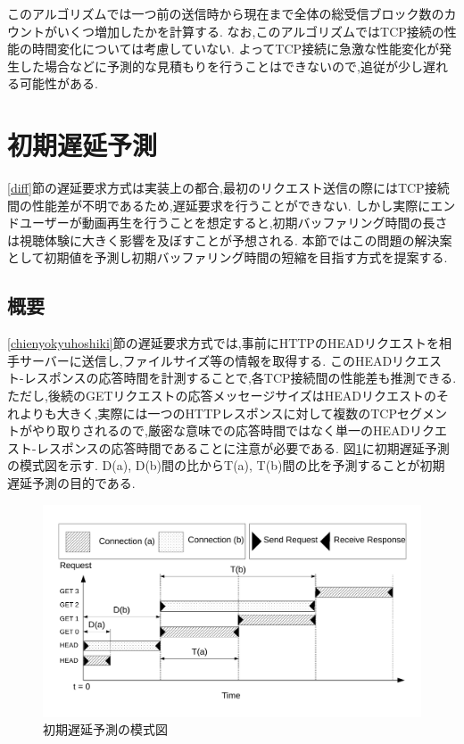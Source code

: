 \documentclass[a4j,12pt]{gradthesis_utf8}
\begin{document}
このアルゴリズムでは一つ前の送信時から現在まで全体の総受信ブロック数のカウントがいくつ増加したかを計算する.
なお,このアルゴリズムではTCP接続の性能の時間変化については考慮していない.
よってTCP接続に急激な性能変化が発生した場合などに予測的な見積もりを行うことはできないので,追従が少し遅れる可能性がある.

\newpage

\section{初期遅延予測}
\label{shoki}
\ref{diff}節の遅延要求方式は実装上の都合,最初のリクエスト送信の際にはTCP接続間の性能差が不明であるため,遅延要求を行うことができない.
しかし実際にエンドユーザーが動画再生を行うことを想定すると,初期バッファリング時間の長さは視聴体験に大きく影響を及ぼすことが予想される.
本節ではこの問題の解決案として初期値を予測し初期バッファリング時間の短縮を目指す方式を提案する.

\subsection{概要}
\label{shokigaiyo}
\ref{chienyokyuhoshiki}節の遅延要求方式では,事前にHTTPのHEADリクエストを相手サーバーに送信し,ファイルサイズ等の情報を取得する.
このHEADリクエスト-レスポンスの応答時間を計測することで,各TCP接続間の性能差も推測できる.
ただし,後続のGETリクエストの応答メッセージサイズはHEADリクエストのそれよりも大きく,実際には一つのHTTPレスポンスに対して複数のTCPセグメントがやり取りされるので,厳密な意味での応答時間ではなく単一のHEADリクエスト-レスポンスの応答時間であることに注意が必要である.
図\ref{head}に初期遅延予測の模式図を示す.
D(a), D(b)間の比からT(a), T(b)間の比を予測することが初期遅延予測の目的である.

\begin{figure}[ht]
	\centering
	\includegraphics[width=15cm]{figure/head.pdf}
	\caption{初期遅延予測の模式図}
	\label{head}
\end{figure}
\end{document}
